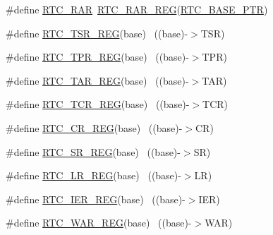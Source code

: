 \begin{DoxyCompactItemize}
\item 
\#define \hyperlink{group___r_t_c___register___accessor___macros_ga88fb58901ea616d3040fb99e3f03722f}{R\+T\+C\+\_\+\+R\+AR}~\hyperlink{group___r_t_c___register___accessor___macros_ga56c0c73ad611109b3e53f53808092bd6}{R\+T\+C\+\_\+\+R\+A\+R\+\_\+\+R\+EG}(\hyperlink{group___r_t_c___peripheral_ga6455e2b767b4b224b4f00b50e87a2441}{R\+T\+C\+\_\+\+B\+A\+S\+E\+\_\+\+P\+TR})
\item 
\#define \hyperlink{group___r_t_c___register___accessor___macros_ga09970f896ffee07c3a05b92951184ffa}{R\+T\+C\+\_\+\+T\+S\+R\+\_\+\+R\+EG}(base)                                            ~((base)-\/$>$T\+SR)
\item 
\#define \hyperlink{group___r_t_c___register___accessor___macros_ga27c10c8200591617cc2855238c16c3f1}{R\+T\+C\+\_\+\+T\+P\+R\+\_\+\+R\+EG}(base)                                            ~((base)-\/$>$T\+PR)
\item 
\#define \hyperlink{group___r_t_c___register___accessor___macros_gacf7df0fe4d98dc87b21ee82db3c7e858}{R\+T\+C\+\_\+\+T\+A\+R\+\_\+\+R\+EG}(base)                                            ~((base)-\/$>$T\+AR)
\item 
\#define \hyperlink{group___r_t_c___register___accessor___macros_ga0ffe9bb5a8168f247f3aac5de0d59080}{R\+T\+C\+\_\+\+T\+C\+R\+\_\+\+R\+EG}(base)                                            ~((base)-\/$>$T\+CR)
\item 
\#define \hyperlink{group___r_t_c___register___accessor___macros_ga478ae857b195216a8eff27d2fdb74ffd}{R\+T\+C\+\_\+\+C\+R\+\_\+\+R\+EG}(base)                                              ~((base)-\/$>$CR)
\item 
\#define \hyperlink{group___r_t_c___register___accessor___macros_ga3f1d213cb9eafd0e56eacd7f40ee8350}{R\+T\+C\+\_\+\+S\+R\+\_\+\+R\+EG}(base)                                              ~((base)-\/$>$SR)
\item 
\#define \hyperlink{group___r_t_c___register___accessor___macros_gaecf5282b232b87123b993ec1ec9bd2a5}{R\+T\+C\+\_\+\+L\+R\+\_\+\+R\+EG}(base)                                              ~((base)-\/$>$LR)
\item 
\#define \hyperlink{group___r_t_c___register___accessor___macros_ga967d371e055b3013c0f94830a357c19d}{R\+T\+C\+\_\+\+I\+E\+R\+\_\+\+R\+EG}(base)                                            ~((base)-\/$>$I\+ER)
\item 
\#define \hyperlink{group___r_t_c___register___accessor___macros_ga2c4d995d9d6c4857f7035982070319b8}{R\+T\+C\+\_\+\+W\+A\+R\+\_\+\+R\+EG}(base)                                            ~((base)-\/$>$W\+AR)

\end{DoxyCompactItemize}
